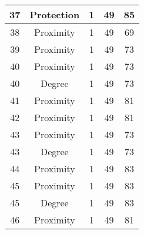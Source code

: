 \documentclass[results.tex]{subfiles}
\begin{document}
\begin{center}
\begin{tabular}{| c || c | c | c | c |}
            \hline
            37                      & Protection                   & 1                      & 49                      & 85                   \\
            \hline
            38                      & Proximity                    & 1                      & 49                      & 69                   \\
            \hline
            39                      & Proximity                    & 1                      & 49                      & 73                   \\
            \hline
            40                      & Proximity                    & 1                      & 49                      & 73                   \\
            \hline
            40                      & Degree                       & 1                      & 49                      & 73                   \\
            \hline
            41                      & Proximity                    & 1                      & 49                      & 81                   \\
            \hline
            42                      & Proximity                    & 1                      & 49                      & 81                   \\
            \hline
            43                      & Proximity                    & 1                      & 49                      & 73                   \\
            \hline
            43                      & Degree                       & 1                      & 49                      & 73                   \\
            \hline
            44                      & Proximity                    & 1                      & 49                      & 83                   \\
            \hline
            45                      & Proximity                    & 1                      & 49                      & 83                   \\
            \hline
            45                      & Degree                       & 1                      & 49                      & 83                   \\
            \hline
            46                      & Proximity                    & 1                      & 49                      & 81                   \\

\end{tabular}
\end{center}
\end{document}
